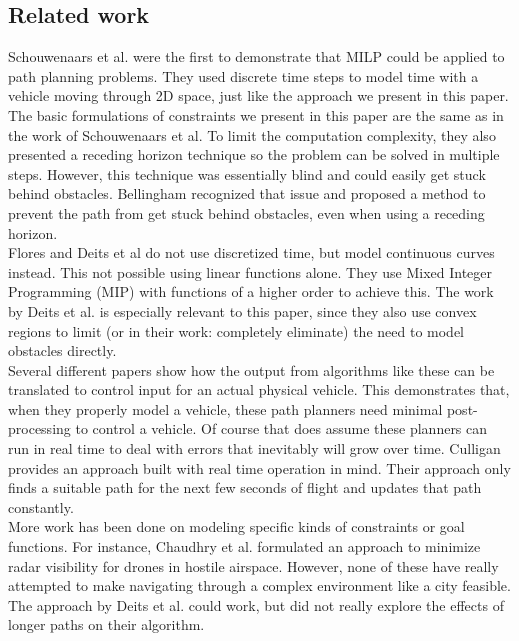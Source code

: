 \subsection{Related work}
Schouwenaars et al. \cite{Schouwenaars2001} were the first to demonstrate that MILP could be applied to path planning problems. They used discrete time steps to model time with a vehicle moving through 2D space, just like the approach we present in this paper. The basic formulations of constraints we present in this paper are the same as in the work of Schouwenaars et al. To limit the computation complexity, they also presented a receding horizon technique so the problem can be solved in multiple steps. However, this technique was essentially blind and could easily get stuck behind obstacles. Bellingham\cite{Bellingham2002} recognized that issue and proposed a method to prevent the path from get stuck behind obstacles, even when using a receding horizon. \\

Flores\cite{Flores2007} and Deits et al\cite{Deits2015} do not use discretized time, but model continuous curves instead. This not possible using linear functions alone. They use Mixed Integer Programming (MIP) with functions of a higher order to achieve this. The work by Deits et al. is especially relevant to this paper, since they also use convex regions to limit (or in their work: completely eliminate) the need to model obstacles directly. \\

Several different papers \cite{Fliess1995a, Hao2005, Cowling2007, Mellinger2011} show how the output from algorithms like these can be translated to control input for an actual physical vehicle. This demonstrates that, when they properly model a vehicle, these path planners need minimal post-processing to control a vehicle. Of course that does assume these planners can run in real time to deal with errors that inevitably will grow over time. Culligan \cite{Culligan2006} provides an approach built with real time operation in mind. Their approach only finds a suitable path for the next few seconds of flight and updates that path constantly. \\

More work has been done on modeling specific kinds of constraints or goal functions. For instance, Chaudhry et al. \cite{Chaudhry2004} formulated an approach to minimize radar visibility for drones in hostile airspace. However, none of these have really attempted to make navigating through a complex environment like a city feasible. The approach by Deits et al. \cite{Deits2015} could work, but did not really explore the effects of longer paths on their algorithm.